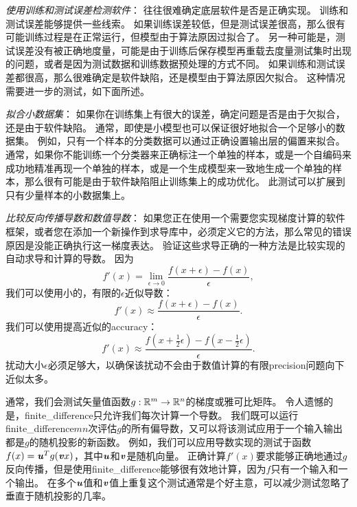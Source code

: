 \emph{使用训练和测试误差检测软件}：
往往很难确定底层软件是否是正确实现。
训练和测试误差能够提供一些线索。
如果训练误差较低，但是测试误差很高，那么很有可能训练过程是在正常运行，但模型由于算法原因过拟合了。
另一种可能是，测试误差没有被正确地度量，可能是由于训练后保存模型再重载去度量测试集时出现的问题，或者是因为测试数据和训练数据预处理的方式不同。
如果训练和测试误差都很高，那么很难确定是软件缺陷，还是模型由于算法原因欠拟合。
这种情况需要进一步的测试，如下面所述。


\emph{拟合小数据集}：
如果你在训练集上有很大的误差，确定问题是否是由于欠拟合，还是由于软件缺陷。
通常，即使是小模型也可以保证很好地拟合一个足够小的数据集。
例如，只有一个样本的分类数据可以通过正确设置输出层的偏置来拟合。
通常，如果你不能训练一个分类器来正确标注一个单独的样本，或是一个自编码来成功地精准再现一个单独的样本，或是一个生成模型来一致地生成一个单独的样本，那么很有可能是由于软件缺陷阻止训练集上的成功优化。
此测试可以扩展到只有少量样本的小数据集上。

\emph{比较反向传播导数和数值导数}：
如果您正在使用一个需要您实现梯度计算的软件框架，或者您在添加一个新操作到求导库中，必须定义它的方法，那么常见的错误原因是没能正确执行这一梯度表达。
验证这些求导正确的一种方法是比较实现的自动求导和计算的导数。
因为
\begin{equation}
	f'(x) = \lim_{\epsilon \to 0} \frac{f(x+\epsilon) - f(x)}{\epsilon},
\end{equation}
我们可以使用小的，有限的$\epsilon$近似导数：
\begin{equation}
	f'(x) \approx \frac{f(x+\epsilon) - f(x)}{\epsilon}.
\end{equation}
我们可以使用提高近似的\gls{accuracy}：
\begin{equation}
	f'(x) \approx \frac{ f(x+\frac{1}{2}\epsilon) - f(x-\frac{1}{2}\epsilon) }{\epsilon}.
\end{equation}
扰动大小$\epsilon$必须足够大，以确保该扰动不会由于数值计算的有限\gls{precision}问题向下近似太多。


通常，我们会测试矢量值函数$g:\mathbb{R}^m \to \mathbb{R}^n$的梯度或雅可比矩阵。
令人遗憾的是，\gls{finite_difference}只允许我们每次计算一个导数。
我们既可以运行\gls{finite_difference}$mn$次评估$g$的所有偏导数，又可以将该测试应用于一个输入输出都是$g$的随机投影的新函数。
例如，我们可以应用导数实现的测试于函数$f(x) = \boldsymbol{\mathit{u}}^T g(\boldsymbol{\mathit{v}} x)$，其中$\boldsymbol{\mathit{u}}$和$\boldsymbol{\mathit{v}}$是随机向量。
正确计算$f'(x)$要求能够正确地通过$g$反向传播，但是使用\gls{finite_difference}能够很有效地计算，因为$f$只有一个输入和一个输出。
在多个$\boldsymbol{\mathit{u}}$值和$\boldsymbol{\mathit{v}}$值上重复这个测试通常是个好主意，可以减少测试忽略了垂直于随机投影的几率。


